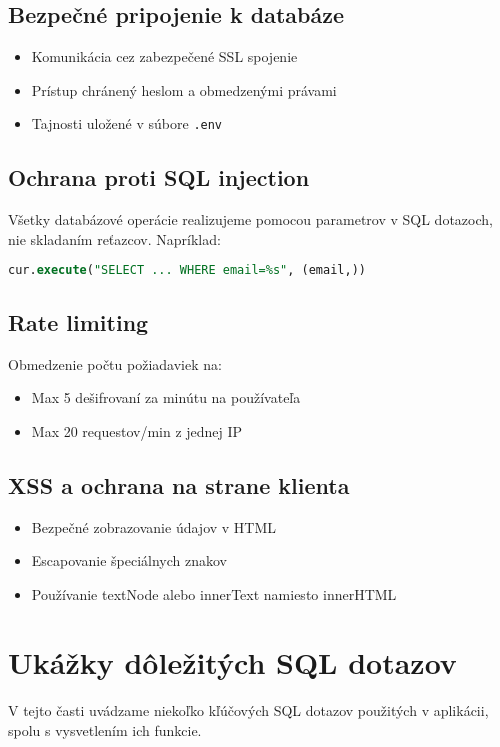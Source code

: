 \documentclass[12pt,a4paper]{article}
\begin{document}
\subsection{Bezpečné pripojenie k databáze}
\begin{itemize}
    \item Komunikácia cez zabezpečené SSL spojenie
    \item Prístup chránený heslom a obmedzenými právami
    \item Tajnosti uložené v súbore \texttt{.env}
\end{itemize}

\subsection{Ochrana proti SQL injection}
Všetky databázové operácie realizujeme pomocou parametrov v SQL dotazoch, nie skladaním reťazcov. Napríklad:

\begin{lstlisting}[language=SQL]
cur.execute("SELECT ... WHERE email=%s", (email,))
\end{lstlisting}

\subsection{Rate limiting}
Obmedzenie počtu požiadaviek na:
\begin{itemize}
    \item Max 5 dešifrovaní za minútu na používateľa
    \item Max 20 requestov/min z jednej IP
\end{itemize}

\subsection{XSS a ochrana na strane klienta}
\begin{itemize}
    \item Bezpečné zobrazovanie údajov v HTML
    \item Escapovanie špeciálnych znakov
    \item Používanie textNode alebo innerText namiesto innerHTML
\end{itemize}

\section{Ukážky dôležitých SQL dotazov}
V tejto časti uvádzame niekoľko kľúčových SQL dotazov použitých v aplikácii, spolu s vysvetlením ich funkcie.
\end{document}
